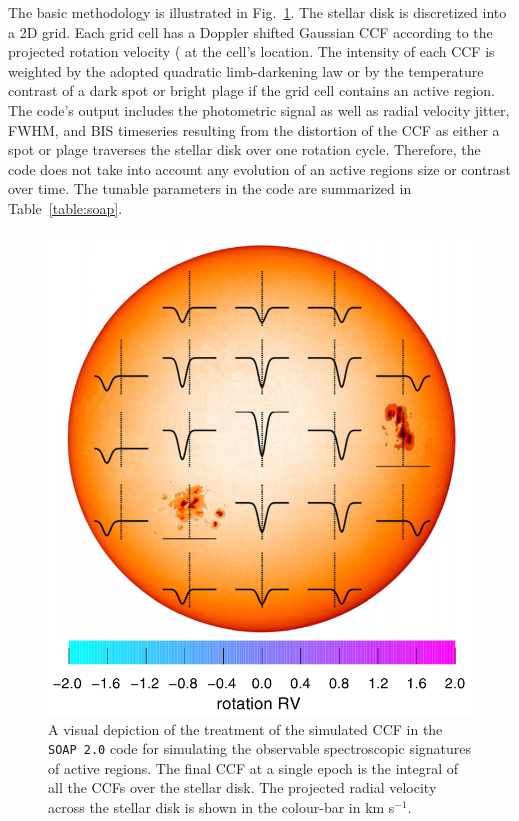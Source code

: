 The basic methodology is illustrated in Fig.~\ref{fig:soapccf}. The stellar disk is discretized into a 
2D grid. Each grid cell has a Doppler shifted Gaussian CCF according to the projected rotation velocity 
(\vsini{)} at the cell's location. The intensity of each 
CCF is weighted by the adopted quadratic 
limb-darkening law \parencite{claret11} or by the temperature contrast of a dark spot or bright plage if 
the grid cell contains an active region. The code's output includes the photometric signal as well as 
radial velocity jitter, FWHM, and BIS timeseries 
resulting from the distortion of the CCF as either a spot or plage 
traverses the stellar disk over one rotation cycle. Therefore, the code does not take into account 
any evolution of an active regions size or contrast over time. The tunable parameters in the code are 
summarized in Table~\ref{table:soap}. \\


\begin{figure}
\centering
\includegraphics[scale=.3]{figures/soapccf.png}
\caption{A visual depiction of the treatment of the simulated CCF in the \texttt{SOAP 2.0} 
code for simulating the observable spectroscopic signatures of active regions. The final CCF 
at a single epoch is the integral of all the CCFs over the stellar disk. 
The projected radial velocity across 
the stellar disk is shown in the colour-bar in km s$^{-1}$. 
\parencite[Image credit:][]{dumusque14} \label{fig:soapccf}}
\end{figure}


